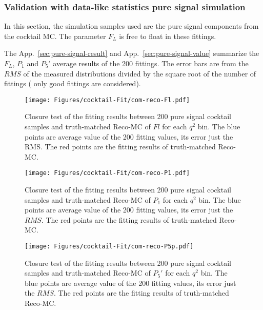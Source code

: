 \subsubsection{Validation with data-like statistics pure signal simulation}
\label{sec:Cocktail-MC-pure}


In this section, the simulation samples used are the pure signal
components from the cocktail MC. The parameter $F_L$ is free to float
in these fittings.

The App.~\ref{sec:pure-signal-result}  and App.~\ref{sec:pure-signal-value} summarize the $F_L$, $P_1$
and $P_5'$ average results of the 200 fittings. The error bars are from the
$RMS$ of the measured distributions divided by the square root of the
number of fittings ( only good fittings are considered).

\begin{figure}[!hbt]
  \centering
  \texttt{[image: Figures/cocktail-Fit/com-reco-Fl.pdf]}
  \caption{Closure test of the fitting results between 200 pure signal cocktail
 samples and truth-matched Reco-MC of $Fl$ for each $q^2$ bin. The blue points
are average value of the 200 fitting values, its error just the RMS. The red
points are the fitting results of truth-matched Reco-MC. }
  \label{fig:Fit bias of Fl}
\end{figure}


\begin{figure}[!hbt]
  \centering
  \texttt{[image: Figures/cocktail-Fit/com-reco-P1.pdf]}
  \caption{Closure test of the fitting results between 200 pure signal cocktail
 samples and truth-matched Reco-MC of $P_1$ for each $q^2$ bin. The blue points
are average value of the 200 fitting values, its error just the $RMS$. The red
points are the fitting results of truth-matched Reco-MC. }
  \label{fig:Fit bias of P1}
\end{figure}

\begin{figure}[!hbt]
  \centering
  \texttt{[image: Figures/cocktail-Fit/com-reco-P5p.pdf]}
  \caption{Closure test of the fitting results between 200 pure signal cocktail
 samples and truth-matched Reco-MC of $P_5'$ for each $q^2$ bin. The blue points
are average value of the 200 fitting values, its error just the $RMS$. The red
points are the fitting results of truth-matched Reco-MC. }
  \label{fig:Fit bias of P5'}
\end{figure}

\clearpage

